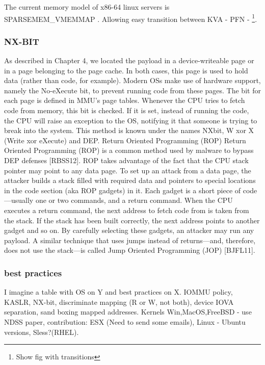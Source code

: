 The current memory model of x86-64 linux servers is SPARSEMEM\_VMEMMAP \cite{mem_model}. Allowing easy transition between KVA - PFN - \page\footnote{Show fig with transitions}.
\subsubsection{NX-BIT}
As described in Chapter 4, we located the payload in a device-writeable page or in
a page belonging to the page cache. In both cases, this page is used to hold data
(rather than code, for example). Modern OSs make use of hardware support, namely
the No-eXecute bit, to prevent running code from these pages. The bit for each page is
defined in MMU’s page tables. Whenever the CPU tries to fetch code from memory, this
bit is checked. If it is set, instead of running the code, the CPU will raise an exception to the OS, notifying it that someone is trying to break into the system. This method is known under the names NX\-bit, W xor X (Write xor eXecute) and DEP.
Return Oriented Programming (ROP) Return Oriented Programming (ROP)
is a common method used by malware to bypass DEP defenses [RBSS12]. ROP takes
advantage of the fact that the CPU stack pointer may point to any data page. To set
up an attack from a data page, the attacker builds a stack filled with required data and
pointers to special locations in the code section (aka ROP gadgets) in it. Each gadget is
a short piece of code—usually one or two commands, and a return command. When the
CPU executes a return command, the next address to fetch code from is taken from the
stack. If the stack has been built correctly, the next address points to another gadget
and so on. By carefully selecting these gadgets, an attacker may run any payload. A
similar technique that uses jumps instead of returns—and, therefore, does not use the
stack—is called Jump Oriented Programming (JOP) [BJFL11].
\subsubsection{best practices}
I imagine a table with OS on Y and best practices on X.
IOMMU policy, KASLR, NX-bit, discriminate mapping (R or W, not both), device IOVA separation, sand boxing mapped addresses.
Kernels Win,MacOS,FreeBSD - use NDSS paper, contribution: ESX (Need to send some emails), Linux - Ubuntu versions, Sless?(RHEL).